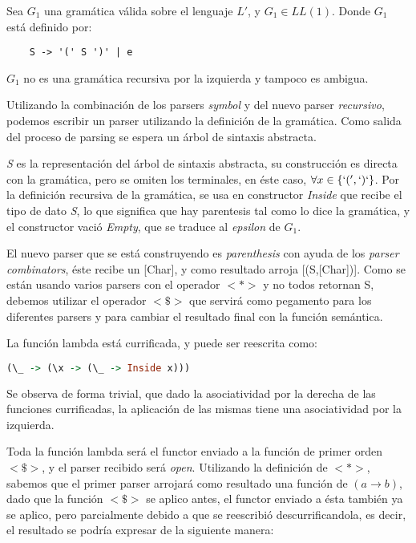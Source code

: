 \begin{exmp}
	Sea $G_1$ una gramática válida sobre el lenguaje $L'$, y $G_1 \in LL(1)$.
	Donde $G_1$ está definido por:

	\begin{lstlisting}
	S -> '(' S ')' | e
	\end{lstlisting}
		
	$G_1$ no es una gramática recursiva por la izquierda y tampoco es ambigua.
	
	Utilizando la combinación de los parsers \emph{symbol} y del nuevo parser \emph{recursivo}, podemos escribir un parser utilizando la definición de la gramática. Como salida del proceso de parsing se espera un árbol de sintaxis abstracta.
	
	
	
	\emph{S} es la representación del árbol de sintaxis abstracta, su construcción es directa con la gramática, pero se omiten los terminales, en éste caso, $\forall x \in \{ `(', `)` \}$. Por la definición recursiva de la gramática, se usa en constructor \emph{Inside} que recibe el tipo de dato \emph{S}, lo que significa que hay parentesis tal como lo dice la gramática, y el constructor vació \emph{Empty}, que se traduce al \emph{epsilon} de $G_1$.
	
	El nuevo parser que se está construyendo es \emph{parenthesis} con ayuda de los \emph{parser combinators}, éste recibe un [Char], y como resultado arroja [(S,[Char])]. Como se están usando varios parsers con el operador $<*>$ y no todos retornan S, debemos utilizar el operador $<\$>$ que servirá como pegamento para los diferentes parsers y para cambiar el resultado final con la función semántica.
	
	La función lambda está currificada, y puede ser reescrita como:
	
	\begin{lstlisting}[language=Haskell]
		(\_ -> (\x -> (\_ -> Inside x)))
	\end{lstlisting}

	Se observa de forma trivial, que dado la asociatividad por la derecha de las funciones currificadas, la aplicación de las mismas tiene una asociatividad por la izquierda.
	
	Toda la función lambda será el functor enviado a la función de primer orden $<\$>$, y el parser recibido será \emph{open}. Utilizando la definición de $<*>$, sabemos que el primer parser arrojará como resultado una función de $(a \to b)$, dado que la función $<\$>$ se aplico antes, el functor enviado a ésta también ya se aplico, pero parcialmente debido a que se reescribió descurrificandola, es decir, el resultado se podría expresar de la siguiente manera:
	

\end{exmp}
